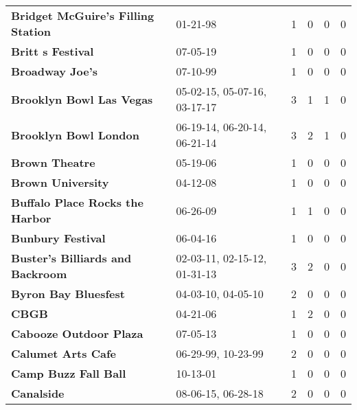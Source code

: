 \begin{supertabular}{llllll}
                           \textbf{Bridget McGuire's Filling Station} &                      01-21-98 &  1 &   0 &  0 &  0 \\
                                            \textbf{Britt s Festival} &                      07-05-19 &  1 &   0 &  0 &  0 \\
                                              \textbf{Broadway Joe's} &                      07-10-99 &  1 &   0 &  0 &  0 \\
                                     \textbf{Brooklyn Bowl Las Vegas} &  05-02-15, 05-07-16, 03-17-17 &  3 &   1 &  1 &  0 \\
                                        \textbf{Brooklyn Bowl London} &  06-19-14, 06-20-14, 06-21-14 &  3 &   2 &  1 &  0 \\
                                               \textbf{Brown Theatre} &                      05-19-06 &  1 &   0 &  0 &  0 \\
                                            \textbf{Brown University} &                      04-12-08 &  1 &   0 &  0 &  0 \\
                              \textbf{Buffalo Place Rocks the Harbor} &                      06-26-09 &  1 &   1 &  0 &  0 \\
                                            \textbf{Bunbury Festival} &                      06-04-16 &  1 &   0 &  0 &  0 \\
                             \textbf{Buster's Billiards and Backroom} &  02-03-11, 02-15-12, 01-31-13 &  3 &   2 &  0 &  0 \\
                                         \textbf{Byron Bay Bluesfest} &            04-03-10, 04-05-10 &  2 &   0 &  0 &  0 \\
                                                        \textbf{CBGB} &                      04-21-06 &  1 &   2 &  0 &  0 \\
                                       \textbf{Cabooze Outdoor Plaza} &                      07-05-13 &  1 &   0 &  0 &  0 \\
                                           \textbf{Calumet Arts Cafe} &            06-29-99, 10-23-99 &  2 &   0 &  0 &  0 \\
                                         \textbf{Camp Buzz Fall Ball} &                      10-13-01 &  1 &   0 &  0 &  0 \\
                                                   \textbf{Canalside} &            08-06-15, 06-28-18 &  2 &   0 &  0 &  0 \\

\end{supertabular}
